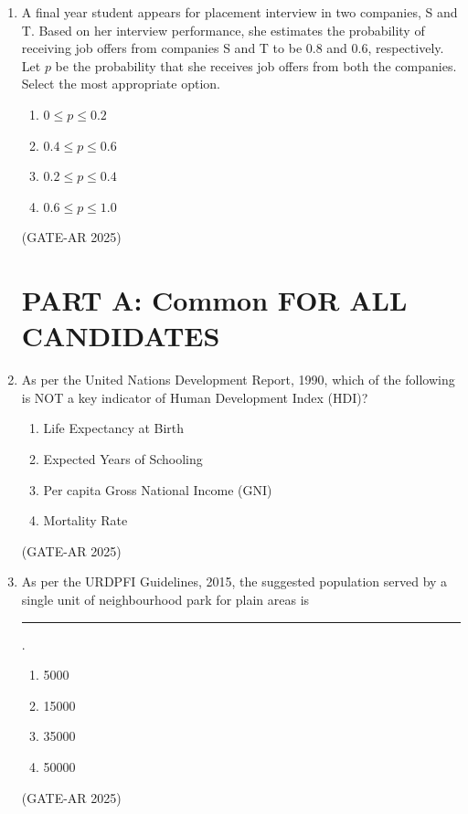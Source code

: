 \documentclass[a4paper,10pt]{article}
\begin{document}
\begin{enumerate}
    \item A final year student appears for placement interview in two companies, S and T. Based on her interview performance, she estimates the probability of receiving job offers from companies S and T to be 0.8 and 0.6, respectively. Let $p$ be the probability that she receives job offers from both the companies. Select the most appropriate option.
    \begin{multicols}{4}
    \begin{enumerate}
        \item $0 \leq p \leq 0.2$
        \item $0.4 \leq p \leq 0.6$
        \item $0.2 \leq p \leq 0.4$
        \item $0.6 \leq p \leq 1.0$
    \end{enumerate}
    \end{multicols}
    \hfill (GATE-AR 2025)

\section*{PART A: Common FOR ALL CANDIDATES}

    \item As per the United Nations Development Report, 1990, which of the following is NOT a key indicator of Human Development Index (HDI)?
    \begin{multicols}{2}
    \begin{enumerate}
        \item Life Expectancy at Birth
        \item Expected Years of Schooling
        \item Per capita Gross National Income (GNI)
        \item Mortality Rate
    \end{enumerate}
    \end{multicols}
    \hfill (GATE-AR 2025)

    \item As per the URDPFI Guidelines, 2015, the suggested population served by a single unit of neighbourhood park for plain areas is \rule{2cm}{0.4pt}.
    \begin{multicols}{4}
    \begin{enumerate}
        \item 5000
        \item 15000
        \item 35000
        \item 50000
    \end{enumerate}
    \end{multicols}
    \hfill (GATE-AR 2025)


\end{enumerate}
\end{document}
